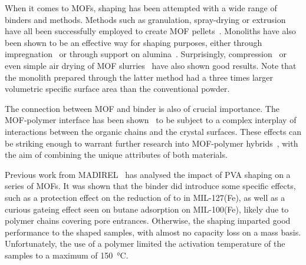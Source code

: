 When it comes to \glspl{MOF}, shaping has been attempted with a wide range
of binders and methods. 
Methods such as granulation, spray-drying or extrusion have
all been successfully employed to create \gls{MOF}
pellets~\cite{kaskelChemistryMetalorganicFrameworks2016}.
Monoliths have also been shown to be an effective way for shaping purposes,
either through impregnation~\cite{ramos-fernandezMOFsMeetMonoliths2011} 
or through support on alumina~\cite{aguadoFacileShapingImidazolatebased2010}.
Surprisingly, compression~\cite{bazer-bachiIndustrialUseMetalorganic2014} or
even simple air drying of \gls{MOF} 
slurries~\cite{tianMechanicallyChemicallyRobust2015}
have also shown good results. Note that the monolith prepared 
through the latter method had a three times larger volumetric 
specific surface area than the conventional powder.

The connection between \gls{MOF} and binder is also of crucial importance. 
The \gls{MOF}-polymer interface has been 
shown~\cite{seminoMicroscopicModelMetal2016} to be
subject to a complex interplay of interactions between the organic
chains and the crystal surfaces. These effects can be striking enough 
to warrant further research into \gls{MOF}-polymer 
hybrids~\cite{kitaoHybridizationMOFsPolymers2017}, with the aim 
of combining the unique attributes of both materials.

Previous work from MADIREL~\cite{chanutObservingEffectsShaping2016} 
has analysed the impact of \gls{PVA} shaping on a series 
of \glspl{MOF}. It was shown that the binder did introduce some specific 
effects, such as a protection effect on the reduction of  to
 in MIL-127(Fe), as well as a curious gateing effect seen on 
butane adsorption on MIL-100(Fe), likely due to polymer chains covering 
pore entrances. Otherwise, the shaping imparted good performance to the
shaped samples, with almost no capacity loss on
a mass basis. Unfortunately, the use of a polymer limited the 
activation temperature of the samples to a maximum of 
\SI{150}{\degreeCelsius}.